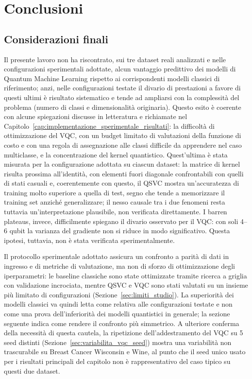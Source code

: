 \chapter*{Conclusioni}

\section*{Considerazioni finali}

Il presente lavoro non ha riscontrato, sui tre dataset reali analizzati e nelle configurazioni sperimentali adottate, alcun vantaggio predittivo dei modelli di Quantum Machine Learning rispetto ai corrispondenti modelli classici di riferimento; anzi, nelle configurazioni testate il divario di prestazioni a favore di questi ultimi è risultato sistematico e tende ad ampliarsi con la complessità del problema (numero di classi e dimensionalità originaria). Questo esito è coerente con alcune spiegazioni discusse in letteratura e richiamate nel Capitolo~\ref{cap:implementazione_sperimentale_risultati}: la difficoltà di ottimizzazione del VQC, con un budget limitato di valutazioni della funzione di costo e con una regola di assegnazione alle classi difficile da apprendere nel caso multiclasse, e la concentrazione del kernel quantistico. Quest'ultima è stata misurata per la configurazione adottata su ciascun dataset: la matrice di kernel risulta prossima all'identità, con elementi fuori diagonale confrontabili con quelli di stati casuali e, coerentemente con questo, il QSVC mostra un'accuratezza di training molto superiore a quella di test, segno che tende a memorizzare il training set anziché generalizzare; il nesso causale tra i due fenomeni resta tuttavia un'interpretazione plausibile, non verificata direttamente.
I barren plateaus, invece, difficilmente spiegano il divario osservato per il VQC: con soli 4--6 qubit la varianza del gradiente non si riduce in modo significativo.
Questa ipotesi, tuttavia, non è stata verificata sperimentalmente.

Il protocollo sperimentale adottato assicura un confronto a parità di dati in ingresso e di metriche di valutazione, ma non di sforzo di ottimizzazione degli iperparametri: le baseline classiche sono state ottimizzate tramite ricerca a griglia con validazione incrociata, mentre QSVC e VQC sono stati valutati su un insieme più limitato di configurazioni (Sezione~\ref{sec:limiti_studio}). La superiorità dei modelli classici va quindi letta come relativa alle configurazioni testate e non come una prova dell'inferiorità dei modelli quantistici in generale; la sezione seguente indica come rendere il confronto più simmetrico. A ulteriore conferma della necessità di questa cautela, la ripetizione dell'addestramento del VQC su 5 seed distinti (Sezione~\ref{sec:variabilita_vqc_seed}) mostra una variabilità non trascurabile su Breast Cancer Wisconsin e Wine, al punto che il seed unico usato per i risultati principali del capitolo non è rappresentativo del caso tipico su questi due dataset.

